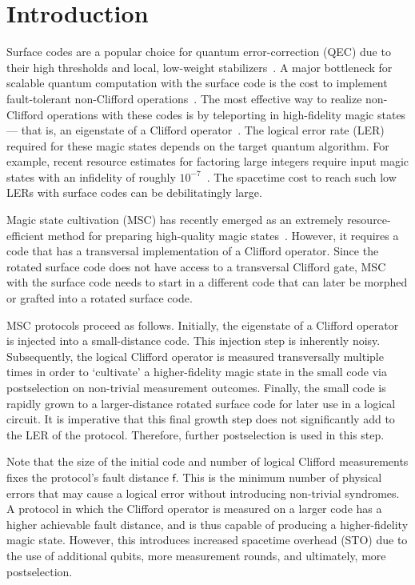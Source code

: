 \documentclass[%
    aps, 
    physrev,
    reprint,
]{revtex4-2}
\begin{document}
\section{Introduction}\label{sec:introduction}

Surface codes are a popular choice for quantum error-correction (QEC) due to their high thresholds and local, low-weight stabilizers~\cite{bravyi1998quantum,dennis2002topological,kitaev2003fault,fowler2012surface}.
A major bottleneck for scalable quantum computation with the surface code is the cost to implement fault-tolerant non-Clifford operations~\cite{fowler2013surface}. 
The most effective way to realize non-Clifford operations with these codes is by teleporting in high-fidelity magic states --- that is, an eigenstate of a Clifford operator~\cite{bravyi2005universal}. 
The logical error rate (LER) required for these magic states depends on the target quantum algorithm. 
For example, recent resource estimates for factoring large integers require input magic states with an infidelity of  roughly $10^{-7}$~\cite{gidney_factor_2025,zhou_resource_2025}.
The spacetime cost to reach such low LERs with surface codes can be debilitatingly large. 

Magic state cultivation (MSC) has recently emerged as an extremely resource-efficient method for preparing high-quality magic states~\cite{gidney2024magic,chen2025efficient,claes2025cultivatingtstatessurface,vaknin2025magic}. 
However, it requires a code that has a transversal implementation of a Clifford operator.
Since the rotated surface code does not have access to a transversal Clifford gate, MSC with the surface code needs to start in a different code that can later be morphed or grafted into a rotated surface code. 

MSC protocols proceed as follows.
Initially, the eigenstate of a Clifford operator is injected into a small-distance code.
This injection step is inherently noisy. 
Subsequently, the logical Clifford operator is measured transversally multiple times in order to `cultivate' a higher-fidelity magic state in the small code via postselection on non-trivial measurement outcomes. 
Finally, the small code is rapidly grown to a larger-distance rotated surface code for later use in a logical circuit. 
It is imperative that this final growth step does not significantly add to the LER of the protocol.
Therefore, further postselection is used in this step.

Note that the size of the initial code and number of logical Clifford measurements fixes the protocol's fault distance $\mathsf{f}$.
This is the minimum number of physical errors that may cause a logical error without introducing non-trivial syndromes. 
A protocol in which the Clifford operator is measured on a larger code has a higher achievable fault distance, and is thus capable of producing a higher-fidelity magic state.
However, this introduces increased spacetime overhead (STO) due to the use of additional qubits, more measurement rounds, and ultimately, more postselection.
\end{document}
